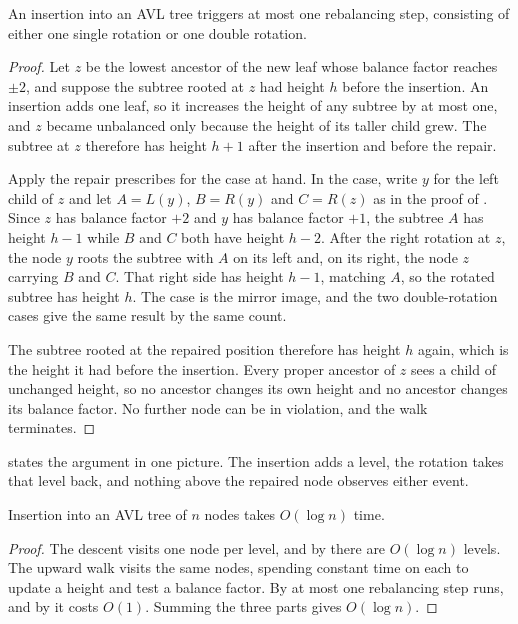 \begin{theorem}
\label{thm:insertone}
An insertion into an AVL tree triggers at most one rebalancing step, consisting
of either one single rotation or one double rotation.
\end{theorem}

\begin{proof}
Let $z$ be the lowest ancestor of the new leaf whose balance factor reaches
$\pm 2$, and suppose the subtree rooted at $z$ had height $h$ before the
insertion. An insertion adds one leaf, so it increases the height of any subtree
by at most one, and $z$ became unbalanced only because the height of its taller
child grew. The subtree at $z$ therefore has height $h+1$ after the insertion and
before the repair.

Apply the repair  prescribes for the case at hand. In the
 case, write $y$ for the left child of $z$ and let $A = L(y)$, $B =
R(y)$ and $C = R(z)$ as in the proof of . Since $z$ has balance
factor $+2$ and $y$ has balance factor $+1$, the subtree $A$ has height $h-1$
while $B$ and $C$ both have height $h-2$. After the right rotation at $z$, the
node $y$ roots the subtree with $A$ on its left and, on its right, the node $z$
carrying $B$ and $C$. That right side has height $h-1$, matching $A$, so the
rotated subtree has height $h$. The  case is the mirror image, and the
two double-rotation cases give the same result by the same count.

The subtree rooted at the repaired position therefore has height $h$ again, which
is the height it had before the insertion. Every proper ancestor of $z$ sees a
child of unchanged height, so no ancestor changes its own height and no ancestor
changes its balance factor. No further node can be in violation, and the walk
terminates.
\end{proof}

 states the argument in one picture. The insertion adds a
level, the rotation takes that level back, and nothing above the repaired node
observes either event.

\begin{corollary}
\label{cor:insertcost}
Insertion into an AVL tree of $n$ nodes takes $O(\log n)$ time.
\end{corollary}

\begin{proof}
The descent visits one node per level, and by  there are
$O(\log n)$ levels. The upward walk visits the same nodes, spending constant time
on each to update a height and test a balance factor. By  at
most one rebalancing step runs, and by  it costs $O(1)$.
Summing the three parts gives $O(\log n)$.
\end{proof}

